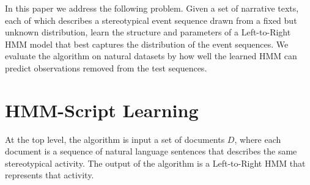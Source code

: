 \documentclass[letterpaper]{article}
\begin{document}

In this paper we address the following problem. Given a set of narrative texts, each of which describes a stereotypical event sequence drawn from a fixed but unknown distribution, learn the structure and parameters of a Left-to-Right HMM model that best captures the distribution of the event sequences. We evaluate the algorithm on natural datasets by how well the learned HMM can predict observations removed from the test sequences.  %


\section{HMM-Script Learning}

At the top level, the algorithm is input a set of documents $D$, where each document is a sequence of natural language sentences that describes the same stereotypical activity.
The output of the algorithm is a Left-to-Right HMM that represents that activity.


\end{document}
